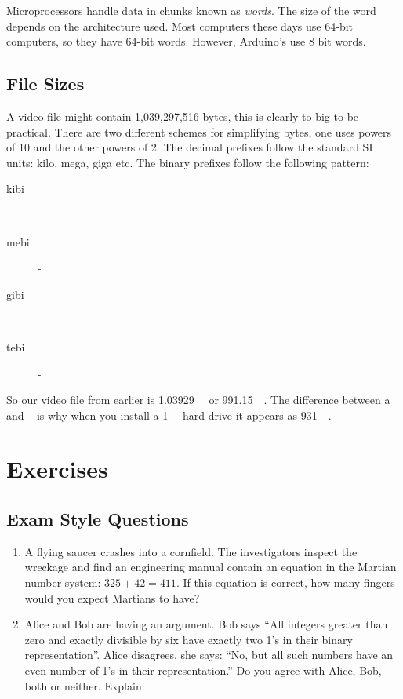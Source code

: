 		Microprocessors handle data in chunks known as \textit{words}. The size of the word depends on the architecture used. Most computers these days use 64-bit computers, so they have 64-bit words. However, Arduino's use 8 bit words.

	\subsection{File Sizes}
		A video file might contain 1,039,297,516 bytes, this is clearly to big to be practical. There are two different schemes for simplifying bytes, one uses powers of 10 and the other powers of 2. The decimal prefixes follow the standard SI units: kilo, mega, giga etc. The binary prefixes follow the following pattern:
			\begin{description}
				\item[kibi] \si{\kibi} - \si[prefixes-as-symbols=false]{\kibi}
				\item[mebi] \si{\mebi} - \si[prefixes-as-symbols=false]{\mebi}
				\item[gibi] \si{\gibi} - \si[prefixes-as-symbols=false]{\gibi}
				\item[tebi] \si{\tebi} - \si[prefixes-as-symbols=false]{\tebi}
			\end{description}
		So our video file from earlier is \SI{1.03929}{\giga\byte} or \SI{991.15}{\mebi\byte}. The difference between a \si{\kibi\byte} and \si{\kilo\byte} is why when you install a \SI{1}{\tera\byte} hard drive it appears as \SI{931}{\gibi\byte}.
\section{Exercises}
\subsection{Exam Style Questions}
\begin{enumerate}
	\item A flying saucer crashes into a cornfield. The investigators inspect the wreckage and find an engineering manual contain an equation in the Martian number system: $325 + 42 = 411$. If this equation is correct, how many fingers would you expect Martians to have?
	\item Alice and Bob are having an argument. Bob says \enquote{All integers greater than zero and exactly divisible by six have exactly two 1's in their binary representation}. Alice disagrees, she says: \enquote{No, but all such numbers have an even number of 1's in their representation.} Do you agree with Alice, Bob, both or neither. Explain.
\end{enumerate}
